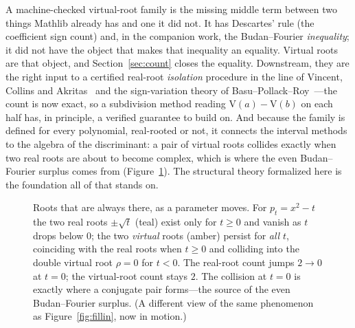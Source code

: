 \documentclass[11pt]{article}
\newcommand{\V}{\mathrm{V}}
\begin{document}
A machine-checked virtual-root family is the missing middle term between two things Mathlib already
has and one it did not. It has Descartes' rule (the coefficient sign count) and, in the companion
work, the Budan--Fourier \emph{inequality}; it did not have the object that makes that inequality an
equality. Virtual roots are that object, and Section~\ref{sec:count} closes the equality. Downstream,
they are the right input to a certified real-root \emph{isolation} procedure in the line of Vincent,
Collins and Akritas~\cite{vincent,collinsakritas,akritas} and the sign-variation theory of
Basu--Pollack--Roy~\cite{bpr}---the count is now exact, so a subdivision method reading
$\V(a)-\V(b)$ on each half has, in principle, a verified guarantee to build on.
And because the family is defined for every polynomial, real-rooted or not, it connects the interval
methods to the algebra of the discriminant: a pair of virtual roots collides exactly when two real
roots are about to become complex, which is where the even Budan--Fourier surplus comes from
(Figure~\ref{fig:bifurc}). The structural theory formalized here is the foundation all of that stands
on.

\begin{figure}[H]
\centering
{}
\caption{Roots that are always there, as a parameter moves. For $p_t=x^2-t$ the two real roots
$\pm\sqrt{t}$ (teal) exist only for $t\ge 0$ and vanish as $t$ drops below $0$; the two \emph{virtual}
roots (amber) persist for \emph{all} $t$, coinciding with the real roots when $t\ge 0$ and colliding
into the double virtual root $\rho=0$ for $t<0$. The real-root count jumps $2\to 0$ at $t=0$; the
virtual-root count stays $2$. The collision at $t=0$ is exactly where a conjugate pair forms---the
source of the even Budan--Fourier surplus. (A different view of the same phenomenon as
Figure~\ref{fig:fillin}, now in motion.)}
\label{fig:bifurc}
\end{figure}
\end{document}
